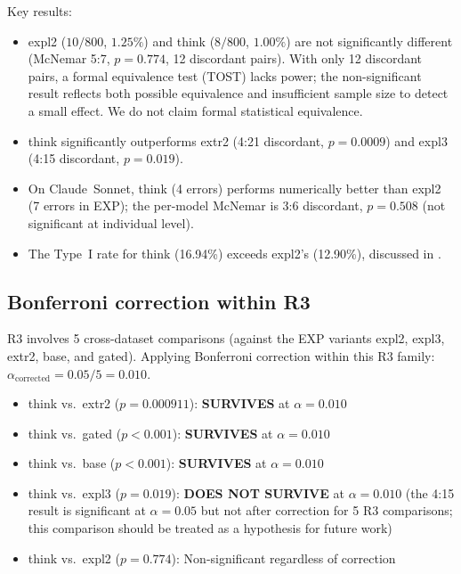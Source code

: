 \documentclass[11pt,a4paper]{article}
\begin{document}
\noindent Key results:
\begin{itemize}[noitemsep]
  \item \textsf{expl2} ($10/800$, $1.25\%$) and \textsf{think} ($8/800$,
    $1.00\%$) are not significantly different (McNemar 5:7, $p = 0.774$,
    12 discordant pairs).  With only 12 discordant pairs, a formal
    equivalence test (TOST) lacks power; the non-significant result reflects
    both possible equivalence and insufficient sample size to detect a small
    effect.  We do not claim formal statistical equivalence.
  \item \textsf{think} significantly outperforms \textsf{extr2}
    (4:21 discordant, $p = 0.0009$) and \textsf{expl3}
    (4:15 discordant, $p = 0.019$).
  \item On Claude~Sonnet, \textsf{think} (4 errors) performs numerically
    better than \textsf{expl2} (7 errors in EXP); the per-model McNemar
    is 3:6 discordant, $p = 0.508$ (not significant at individual level).
  \item The Type~I rate for \textsf{think} (16.94\%) exceeds
    \textsf{expl2}'s (12.90\%), discussed in .
\end{itemize}

\subsection{Bonferroni correction within R3}
\label{sec:r3:bonferroni}

R3 involves 5 cross-dataset comparisons (against the EXP variants
\textsf{expl2}, \textsf{expl3}, \textsf{extr2}, \textsf{base}, and
\textsf{gated}).  Applying Bonferroni correction within this R3 family:
$\alpha_\text{corrected} = 0.05 / 5 = 0.010$.

\begin{itemize}[noitemsep]
  \item \textsf{think} vs.\ \textsf{extr2} ($p = 0.000911$):
    \textbf{SURVIVES} at $\alpha = 0.010$
  \item \textsf{think} vs.\ \textsf{gated} ($p < 0.001$):
    \textbf{SURVIVES} at $\alpha = 0.010$
  \item \textsf{think} vs.\ \textsf{base} ($p < 0.001$):
    \textbf{SURVIVES} at $\alpha = 0.010$
  \item \textsf{think} vs.\ \textsf{expl3} ($p = 0.019$):
    \textbf{DOES NOT SURVIVE} at $\alpha = 0.010$
    (the 4:15 result is significant at $\alpha = 0.05$ but not after
    correction for 5 R3 comparisons; this comparison should be treated
    as a hypothesis for future work)
  \item \textsf{think} vs.\ \textsf{expl2} ($p = 0.774$):
    Non-significant regardless of correction
\end{itemize}
\end{document}

